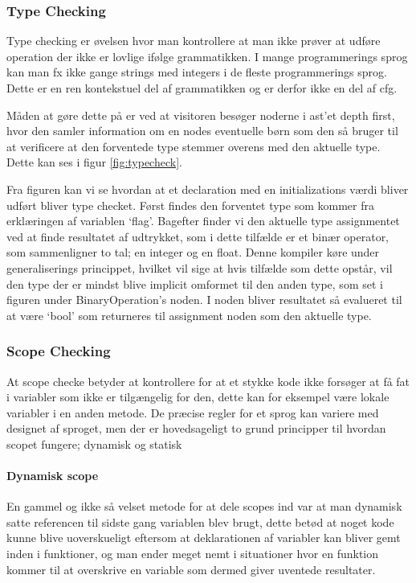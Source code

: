 \subsubsection{Type Checking}
    
    Type checking er øvelsen hvor man kontrollere at man ikke prøver at udføre operation der ikke er lovlige ifølge grammatikken. I mange programmerings sprog kan man fx ikke gange strings med integers i de fleste programmerings sprog. Dette er en ren kontekstuel del af grammatikken og er derfor ikke en del af \gls{cfg}.
    
    Måden at gøre dette på er ved at visitoren besøger noderne i \gls{ast}'et depth first, hvor den samler information om en nodes eventuelle børn som den så bruger til at verificere at den forventede type stemmer overens med den aktuelle type. Dette kan ses i figur \ref{fig:typecheck}.
    
    
    Fra figuren kan vi se hvordan at et declaration med en initializations værdi bliver udført bliver type checket. Først findes den forventet type som kommer fra erklæringen af variablen \enquote*{flag}. Bagefter finder vi den aktuelle type assignmentet ved at finde resultatet af udtrykket, som i dette tilfælde er et binær operator, som sammenligner to tal; en integer og en float. Denne kompiler køre under generaliserings princippet, hvilket vil sige at hvis tilfælde som dette opstår, vil den type der er mindst blive implicit omformet til den anden type, som set i figuren under BinaryOperation's noden. I noden bliver resultatet så evalueret til at være \enquote*{bool} som returneres til assignment noden som den aktuelle type.
    
\subsubsection{Scope Checking}

    At scope checke betyder at kontrollere for at et stykke kode ikke forsøger at få fat i variabler som ikke er tilgængelig for den, dette kan for eksempel være lokale variabler i en anden metode. De præcise regler for et sprog kan variere med designet af sproget, men der er hovedsageligt to grund principper til hvordan scopet fungere; dynamisk og statisk
    
    \paragraph{Dynamisk scope} En gammel og ikke så velset metode for at dele scopes ind var at man dynamisk satte referencen til sidste gang variablen blev brugt, dette betød at noget kode kunne blive uoverskueligt eftersom at deklarationen af variabler kan bliver gemt inden i funktioner, og man ender meget nemt i situationer hvor en funktion kommer til at overskrive en variable som dermed giver uventede resultater. 
    
